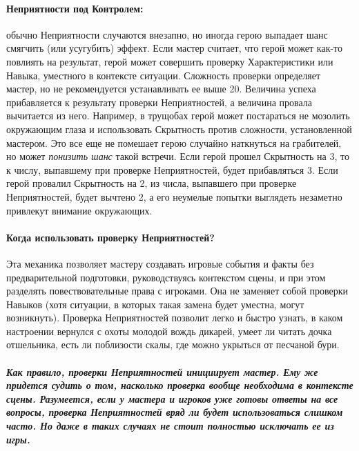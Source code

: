 \paragraph{Неприятности под Контролем:} обычно Неприятности случаются внезапно, но иногда герою выпадает шанс смягчить (или усугубить) эффект. Если мастер считает, что герой может как-то повлиять на результат, герой может совершить проверку Характеристики или Навыка, уместного в контексте ситуации. Сложность проверки определяет мастер, но не рекомендуется устанавливать ее выше 20. Величина успеха прибавляется к результату проверки Неприятностей, а величина провала вычитается из него. Например, в трущобах герой может постараться не мозолить окружающим глаза и использовать Скрытность против сложности, установленной мастером. Это все еще не помешает герою случайно наткнуться на грабителей, но может \textit{понизить шанс} такой встречи. Если герой прошел Скрытность на 3, то к числу, выпавшему при проверке Неприятностей, будет прибавляться 3. Если герой провалил Скрытность на 2, из числа, выпавшего при проверке Неприятностей, будет вычтено 2, а его неумелые попытки выглядеть незаметно привлекут внимание окружающих.
\paragraph{Когда использовать проверку Неприятностей?} Эта механика позволяет мастеру создавать игровые события и факты без предварительной подготовки, руководствуясь контекстом сцены, и при этом разделять повествовательные права с игроками. Она не заменяет собой проверки Навыков (хотя ситуации, в которых такая замена будет уместна, могут возникнуть). Проверка Неприятностей позволит легко и быстро узнать, в каком настроении вернулся с охоты молодой вождь дикарей, умеет ли читать дочка отшельника, есть ли поблизости скалы, где можно укрыться от песчаной бури.
\paragraph{\textit{Как правило, проверки Неприятностей инициирует мастер. Ему же придется судить о том, насколько проверка вообще необходима в контексте сцены. Разумеется, если у мастера и игроков уже готовы ответы на все вопросы, проверка Неприятностей вряд ли будет использоваться слишком часто. Но даже в таких случаях не стоит полностью исключать ее из игры.}}
